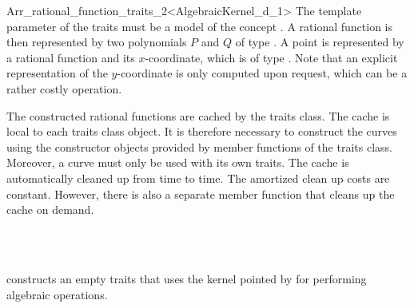 \begin{ccRefClass}{Arr_rational_function_traits_2<AlgebraicKernel_d_1>}
The template parameter of the traits must be a model of the 
concept . 
A rational function is then represented by two polynomials $P$ and $Q$ of type 
. 
A point is represented by a rational function and its $x$-coordinate, which is 
of type . 
Note that an explicit representation of the $y$-coordinate is only computed upon 
request, which can be a rather costly operation. 


The constructed rational functions are cached by the traits class. 
The cache is local to each traits class object. 
It is therefore necessary to construct the curves using the constructor 
objects provided by member functions of the traits class. 
Moreover, a curve must only be used with its own traits. 
The cache is automatically  cleaned up from time to time.
The amortized clean up costs are constant. However, there is also a 
separate member function that cleans up the cache on demand.  


\ccIsModel
  \\
  \\

\ccTypes
{} 
\ccGlue
{}\ccGlue
{}\ccGlue
{}\ccGlue
{}


\ccCreation
  {constructs an empty traits that uses the kernel pointed by 
   for performing algebraic operations.}


\end{ccRefClass}

